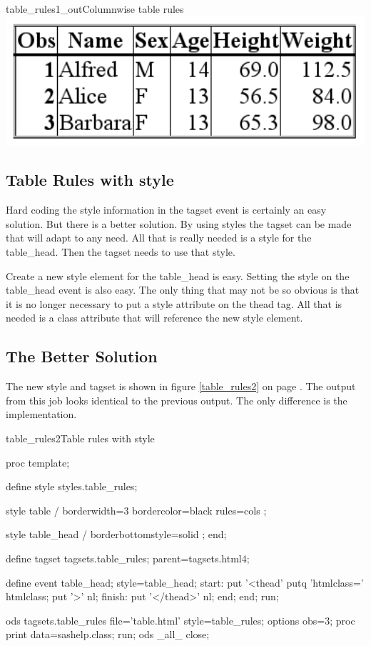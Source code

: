 \begin{goutput}{table_rules1_out}{Columnwise table rules}
\includegraphics[width=6in]{table_rules1.png}
\end{goutput}

\subsection{Table Rules with style}
Hard coding the style information in the tagset event is certainly
an easy solution.  But there is a better solution.  By using styles
the tagset can be made that will adapt to any need.  All that is really
needed is a style for the table\_head.  Then the tagset needs to use
that style.

Create a new style element for the table\_head is easy.  Setting 
the style on the table\_head
event is also easy.  The only thing that may not be so obvious is that
it is no longer necessary to put a style attribute on the thead tag.
All that is needed is a class attribute that will reference the new
style element.

\subsection{The Better Solution}
The new style and tagset is shown
in figure \ref{table_rules2} on page \pageref{table_rules2}.
The output from this job looks identical to the previous output. The
only difference is the implementation.

\begin{fvcode}{table_rules2}{Table rules with style}

proc template;

    define style styles.table_rules;

        style table /
          borderwidth=3
          bordercolor=black
          rules=cols
        ;

        style table_head /
          borderbottomstyle=solid
        ;
     end;

    define tagset tagsets.table_rules;
        parent=tagsets.html4;

        define event table_head;
            style=table_head;
            start:
                put '<thead'
                putq 'htmlclass=' htmlclass;
                put '>' nl;
            finish:
                put '</thead>' nl;
        end;
    end;
run;

ods tagsets.table_rules file='table.html' style=table_rules;
options obs=3;
proc print data=sashelp.class; run;
ods _all_ close;
\end{fvcode}

